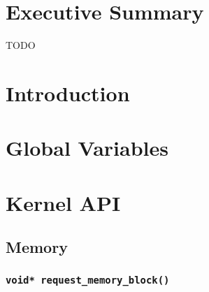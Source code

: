 \documentclass[se]{uw-wkrpt}
\begin{document}
\frontmatter

\section{Executive Summary}
TODO

\tableofcontents
\listoffigures
\listoftables

\mainmatter

\section{Introduction}\label{sec:intro}

\section{Global Variables}\label{sec:global}

\section{Kernel API}\label{sec:kernel}

\subsection{Memory}

\subsubsection{\texttt{void* request\_memory\_block()}}
\end{document}
